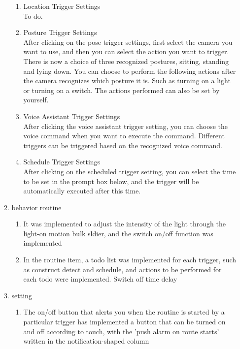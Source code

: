 \documentclass[11pt, conference]{IEEEtran}
\begin{document}
\begin{enumerate}[label=\arabic*]
\begin{enumerate}[label=\alph*]
            \begin{enumerate}
                \item  Location Trigger Settings\\
                    To do.\\
                \item  Posture Trigger Settings\\
                    After clicking on the pose trigger settings, first select the camera you want to use, and then you can select the action you want to trigger. There is now a choice of three recognized postures, sitting, standing and lying down. You can choose to perform the following actions after the camera recognizes which posture it is. Such as turning on a light or turning on a switch. The actions performed can also be set by yourself.\\
                \item  Voice Assistant Trigger Settings\\
                    After clicking the voice assistant trigger setting, you can choose the voice command when you want to execute the command. Different triggers can be triggered based on the recognized voice command.\\
                \item  Schedule Trigger Settings\\
                    After clicking on the scheduled trigger setting, you can select the time to be set in the prompt box below, and the trigger will be automatically executed after this time.\\
            \end{enumerate}
            
        \item behavior routine
        \begin{enumerate}
            \item It was implemented to adjust the intensity of the light through the light-on motion bulk sldier, and the switch on/off function was implemented\\
            

            \item In the routine item, a todo list was implemented for each trigger, such as construct detect and schedule, and actions to be performed for each todo were implemented. Switch off time delay
        \end{enumerate}
        \item setting
            \begin{enumerate}
            \item The on/off button that alerts you when the routine is started by a particular trigger has implemented a button that can be turned on and off according to touch, with the 'push alarm on route starts' written in the notification-shaped column\\


\end{enumerate}
\end{enumerate}
\end{enumerate}
\end{document}
